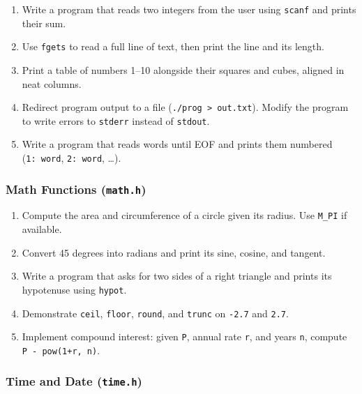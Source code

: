 \documentclass[
  letterpaper,
  DIV=11,
  numbers=noendperiod]{scrreprt}
\providecommand{\tightlist}{%
  \setlength{\itemsep}{0pt}\setlength{\parskip}{0pt}}
\begin{document}
\begin{enumerate}
\def\labelenumi{\arabic{enumi}.}
\tightlist
\item
  Write a program that reads two integers from the user using
  \texttt{scanf} and prints their sum.
\item
  Use \texttt{fgets} to read a full line of text, then print the line
  and its length.
\item
  Print a table of numbers 1--10 alongside their squares and cubes,
  aligned in neat columns.
\item
  Redirect program output to a file
  (\texttt{./prog\ \textgreater{}\ out.txt}). Modify the program to
  write errors to \texttt{stderr} instead of \texttt{stdout}.
\item
  Write a program that reads words until EOF and prints them numbered
  (\texttt{1:\ word}, \texttt{2:\ word}, \ldots).
\end{enumerate}

\subsubsection{\texorpdfstring{Math Functions
(\texttt{math.h})}{Math Functions (math.h)}}\label{math-functions-math.h-1}

\begin{enumerate}
\def\labelenumi{\arabic{enumi}.}
\setcounter{enumi}{5}
\tightlist
\item
  Compute the area and circumference of a circle given its radius. Use
  \texttt{M\_PI} if available.
\item
  Convert 45 degrees into radians and print its sine, cosine, and
  tangent.
\item
  Write a program that asks for two sides of a right triangle and prints
  its hypotenuse using \texttt{hypot}.
\item
  Demonstrate \texttt{ceil}, \texttt{floor}, \texttt{round}, and
  \texttt{trunc} on \texttt{-2.7} and \texttt{2.7}.
\item
  Implement compound interest: given \texttt{P}, annual rate \texttt{r},
  and years \texttt{n}, compute \texttt{P\ -\ pow(1+r,\ n)}.
\end{enumerate}

\subsubsection{\texorpdfstring{Time and Date
(\texttt{time.h})}{Time and Date (time.h)}}\label{time-and-date-time.h-1}
\end{document}
